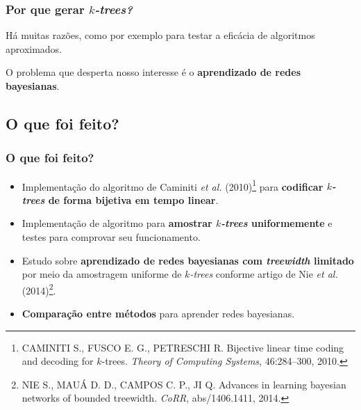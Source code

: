 \documentclass{beamer}
\begin{document}
  \begin{frame}
    \frametitle{Por que gerar \emph{$k$-trees?}}

    Há muitas razões, como por exemplo para testar a eficácia de algoritmos aproximados.

    \vspace{1em}

    O problema que desperta nosso interesse é o \textbf{aprendizado de redes bayesianas}.
  \end{frame}

  \subsection{O que foi feito?}

  \begin{frame}
    \frametitle{O que foi feito?}

    \begin{itemize}
      \item Implementação do algoritmo de Caminiti \emph{et al.} (2010)\footnote{\scriptsize CAMINITI S., FUSCO E. G., PETRESCHI R. Bijective linear time coding and decoding for $k$-trees. \emph{Theory of Computing Systems}, 46:284--300, 2010.} para \textbf{codificar \emph{$k$-trees} de forma bijetiva em tempo linear}.
      \item Implementação de algoritmo para \textbf{amostrar \emph{$k$-trees} uniformemente} e testes para comprovar seu funcionamento.
      \item Estudo sobre \textbf{aprendizado de redes bayesianas com \emph{treewidth} limitado} por meio da amostragem uniforme de \emph{$k$-trees} conforme artigo de Nie \emph{et al.} (2014)\footnote{\scriptsize NIE S., MAUÁ D. D., CAMPOS C. P., JI Q. Advances in learning bayesian networks of bounded treewidth. \emph{CoRR}, abs/1406.1411, 2014.}.
      \item \textbf{Comparação entre métodos} para aprender redes bayesianas.
    \end{itemize}
  \end{frame}

%
%
\end{document}
